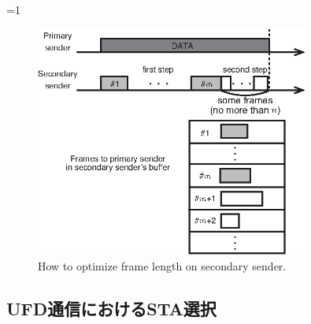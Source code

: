 \documentclass[master]{kuisthesis}		%
\newcounter{flagFig}
\begin{document}
		\ifnum\value{flagFig}=1 {\begin{figure}[t]
			\begin{center}
				\includegraphics[width=0.8\textwidth]{fig/opti.eps}
				\caption{How to optimize frame length on secondary sender.}
				\label{fig:opti}
			\end{center}
		\end{figure}}\fi

	\subsection{UFD通信におけるSTA選択}\label{sec:ufd_propose}
\end{document}
